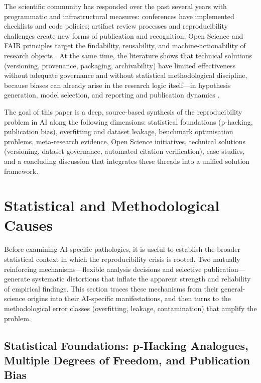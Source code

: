 \documentclass[12pt, a4paper]{article}
\begin{document}
The scientific community has responded over the past several years with
programmatic and infrastructural measures: conferences have implemented
checklists and code policies; artifact review processes and
reproducibility challenges create new forms of publication and
recognition; Open Science and FAIR principles target the findability,
reusability, and machine-actionability of research objects
\cite{NeurIPSChecklist2023,Wilkinson2016,Nosek2015}.  At the same time,
the literature shows that technical solutions (versioning, provenance,
packaging, archivability) have limited effectiveness without adequate
governance and without statistical methodological discipline, because
biases can already arise in the research logic itself---in hypothesis
generation, model selection, and reporting and publication dynamics
\cite{Kapoor2023,Munafo2017}.

The goal of this paper is a deep, source-based synthesis of the
reproducibility problem in AI along the following dimensions: statistical
foundations (p-hacking, publication bias), overfitting and dataset
leakage, benchmark optimisation problems, meta-research evidence,
Open Science initiatives, technical solutions (versioning, dataset
governance, automated citation verification), case studies, and a
concluding discussion that integrates these threads into a unified
solution framework.

\section{Statistical and Methodological Causes}
\label{sec:statistical}

Before examining AI-specific pathologies, it is useful to establish the
broader statistical context in which the reproducibility crisis is
rooted.  Two mutually reinforcing mechanisms---flexible analysis
decisions and selective publication---generate systematic distortions
that inflate the apparent strength and reliability of empirical findings.
This section traces these mechanisms from their general-science origins
into their AI-specific manifestations, and then turns to the
methodological error classes (overfitting, leakage, contamination) that
amplify the problem.

\subsection{Statistical Foundations: p-Hacking Analogues, Multiple
            Degrees of Freedom, and Publication Bias}
\label{sec:phacking}
\end{document}
